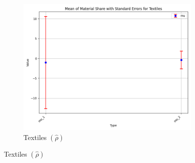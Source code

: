 \documentclass{article}
\begin{document}
\begin{figure}[ht!]
\begin{subfigure}[t]{0.32\textwidth}
        \centering
        \includegraphics[width=\textwidth]{figure/empirical_ar1_normal_kmshare_ciiu_mu_with_error_bars_Textiles.png}
        \caption{Textiles $(\hat\rho)$}
    \end{subfigure}


\end{figure}
\end{document}
